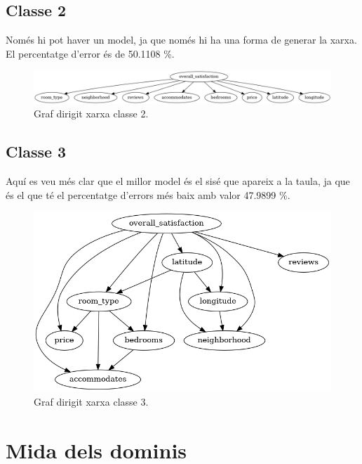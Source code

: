 \documentclass{article}
\begin{document}
\subsection{Classe 2}
Només hi pot haver un model, ja que només hi ha una forma de generar la xarxa. El percentatge d'error és de 50.1108 \%.
\begin{figure}[H]
  \includegraphics[width=\linewidth]{classe2.png}
  \caption{Graf dirigit xarxa classe 2.}
  \label{fig:gp2}
\end{figure}
\newpage
\subsection{Classe 3}
Aquí es veu més clar que el millor model és el sisé que apareix a la taula, ja que és el que té el percentatge d'errors més baix amb valor 47.9899 \%.
\begin{figure}[H]
  \includegraphics[width=\linewidth]{classe3.png}
  \caption{Graf dirigit xarxa classe 3.}
  \label{fig:gp3}
\end{figure}

\section{Mida dels dominis}
\end{document}
